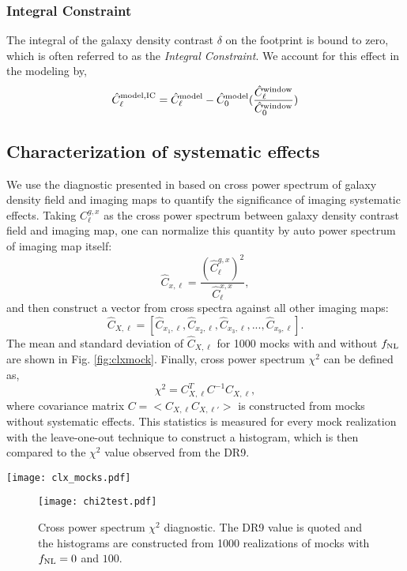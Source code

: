 \subsubsection{Integral Constraint}
The integral of the galaxy density contrast $\delta$ on the footprint is bound to zero, which is often referred to as the \textit{Integral Constraint}. We account for this effect in the modeling by,
\begin{equation}
     \hat{C}^{\rm model, IC}_{\ell} = \hat{C}^{\rm model}_{\ell} - \hat{C}^{\rm model}_{0} (\frac{\hat{C}^{\rm window}_{\ell}}{\hat{C}^{\rm window}_{0}})
\end{equation}


\subsection{Characterization of systematic effects}
\label{ssec:characterization}
We use the diagnostic presented in  based on cross power spectrum of galaxy density field and imaging maps to quantify the significance of imaging systematic effects. Taking $C^{g,x}_{\ell}$ as the cross power spectrum between galaxy density contrast field and imaging map, one can normalize this quantity by auto power spectrum of imaging map itself:
\begin{equation}
\hat{C}_{x, \ell} = \frac{(\hat{C}^{g,x}_{\ell})^{2}}{\hat{C}^{x,x}_{\ell}},
\end{equation}
and then construct a vector from cross spectra against all other imaging maps:
\begin{equation}
\hat{C}_{X, \ell} = [\hat{C}_{x_{1}, \ell}, \hat{C}_{x_{2}, \ell}, \hat{C}_{x_{3}, \ell}, ..., \hat{C}_{x_{9}, \ell}].
\end{equation}
The mean and standard deviation of $\hat{C}_{X, \ell}$ for 1000 mocks with and without $f_{\rm NL}$ are shown in Fig. \ref{fig:clxmock}.  Finally, cross power spectrum $\chi^{2}$ can be defined as,
\begin{equation}
\chi^{2} = C^{T}_{X, \ell} C^{-1} C_{X, \ell},
\end{equation}
where covariance matrix $C = < C_{X, \ell} C_{X, \ell'} >$ is constructed from mocks without systematic effects. This statistics is measured for every mock realization with the leave-one-out technique to construct a histogram, which is then compared to the $\chi^{2}$ value observed from the DR9. 

\begin{figure*}
\centering
\texttt{[image: clx\_mocks.pdf]}
\caption{Normalized cross power spectrum of mocks. Top: mean cross spectrum. Bottom: standard deviation.}\label{fig:clxmock}
\end{figure*}

\begin{figure}
\centering
\texttt{[image: chi2test.pdf]}
\caption{Cross power spectrum $\chi^{2}$ diagnostic. The DR9 value is quoted and the histograms are constructed from 1000 realizations of mocks with $f_{\rm NL}=0$ and $100$.}
\end{figure}


